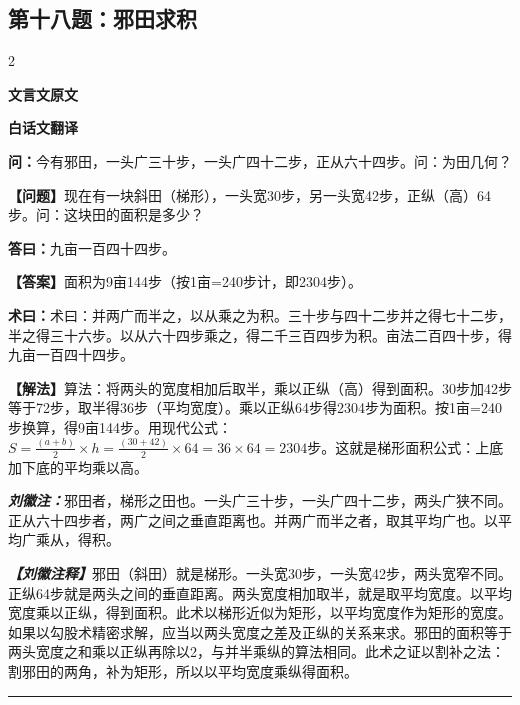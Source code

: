 \documentclass[10pt,a4paper]{article}
\newcommand{\wen}[1]{\textbf{\color{problemcolor}问：}#1\par}
\newcommand{\da}[1]{\textbf{答曰：}#1\par}
\newcommand{\shu}[1]{\textbf{术曰：}#1\par}
\newcommand{\liuhui}[1]{{\color{commentarycolor}\textit{\textbf{刘徽注：}}#1\par}}
\newcommand{\classicalheader}[1]{{\centering\large\bfseries\color{classicalcolor} #1\par\vspace{0.5em}}}
\newcommand{\wenmodern}[1]{\textbf{\color{moderncolor}【问题】}#1\par}
\newcommand{\damodern}[1]{\textbf{【答案】}#1\par}
\newcommand{\shumodern}[1]{\textbf{【解法】}#1\par}
\newcommand{\liuhuimodern}[1]{{\color{commentarycolor}\textit{\textbf{【刘徽注释】}}#1\par}}
\newcommand{\modernheader}[1]{{\centering\large\bfseries\color{moderncolor} #1\par\vspace{0.5em}}}
\newcommand{\problemsec}[1]{\subsection*{#1}}
\begin{document}
\problemsec{第十八题：邪田求积}
\begin{paracol}{2}
\classicalheader{文言文原文}
\switchcolumn
\modernheader{白话文翻译}
\switchcolumn*

\wen{今有邪田，一头广三十步，一头广四十二步，正从六十四步。问：为田几何？}

\switchcolumn

\wenmodern{现在有一块斜田（梯形），一头宽30步，另一头宽42步，正纵（高）64步。问：这块田的面积是多少？}

\switchcolumn*

\da{九亩一百四十四步。}

\switchcolumn

\damodern{面积为9亩144步（按1亩=240步计，即2304步）。}

\switchcolumn*

\shu{术曰：并两广而半之，以从乘之为积。三十步与四十二步并之得七十二步，半之得三十六步。以从六十四步乘之，得二千三百四步为积。亩法二百四十步，得九亩一百四十四步。}

\switchcolumn

\shumodern{算法：将两头的宽度相加后取半，乘以正纵（高）得到面积。30步加42步等于72步，取半得36步（平均宽度）。乘以正纵64步得2304步为面积。按1亩=240步换算，得9亩144步。用现代公式：$S=\frac{(a+b)}{2}\times h=\frac{(30+42)}{2}\times64=36\times64=2304$步。这就是梯形面积公式：上底加下底的平均乘以高。}

\switchcolumn*

\liuhui{邪田者，梯形之田也。一头广三十步，一头广四十二步，两头广狭不同。正从六十四步者，两广之间之垂直距离也。并两广而半之者，取其平均广也。以平均广乘从，得积。}

\switchcolumn

\liuhuimodern{邪田（斜田）就是梯形。一头宽30步，一头宽42步，两头宽窄不同。正纵64步就是两头之间的垂直距离。两头宽度相加取半，就是取平均宽度。以平均宽度乘以正纵，得到面积。此术以梯形近似为矩形，以平均宽度作为矩形的宽度。如果以勾股术精密求解，应当以两头宽度之差及正纵的关系来求。邪田的面积等于两头宽度之和乘以正纵再除以2，与并半乘纵的算法相同。此术之证以割补之法：割邪田的两角，补为矩形，所以以平均宽度乘纵得面积。}

\end{paracol}

\vspace{0.3cm}
\hrule
\vspace{0.3cm}
\end{document}
